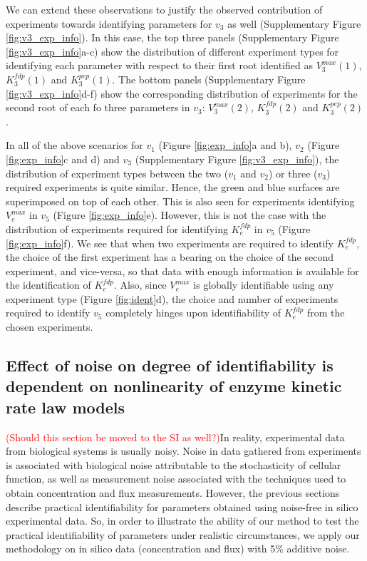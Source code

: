 \documentclass[10pt]{article}
\begin{document}
	We can extend these observations to justify the observed contribution of experiments towards identifying parameters for $v_3$ as well (Supplementary Figure \ref{fig:v3_exp_info}). In this case, the top three panels (Supplementary Figure \ref{fig:v3_exp_info}a-c) show the distribution of different experiment types for identifying each parameter with respect to their first root identified as $V_3^{max}(1)$, $K_3^{fdp}(1)$ and $K_3^{pep}(1)$. The bottom panels (Supplementary Figure \ref{fig:v3_exp_info}d-f) show the corresponding distribution of experiments for the second root of each fo three parameters in $v_3$: $V_3^{max}(2)$, $K_3^{fdp}(2)$ and $K_3^{pep}(2)$. 
	
	In all of the above scenarios for $v_1$ (Figure \ref{fig:exp_info}a and b), $v_2$ (Figure \ref{fig:exp_info}c and d) and $v_3$ (Supplementary Figure \ref{fig:v3_exp_info}), the distribution of experiment types between the two ($v_1$ and $v_2$) or three ($v_3$) required experiments is quite similar. Hence, the green and blue surfaces are superimposed on top of each other. This is also seen for experiments identifying $V_e^{max}$ in $v_5$ (Figure \ref{fig:exp_info}e). However, this is not the case with the distribution of experiments required for identifying $K_e^{fdp}$ in $v_5$ (Figure \ref{fig:exp_info}f). We see that when two experiments are required to identify $K_e^{fdp}$, the choice of the first experiment has a bearing on the choice of the second experiment, and vice-versa, so that data with enough information is available for the identification of $K_e^{fdp}$. Also, since $V_e^{max}$ is globally identifiable using any experiment type (Figure \ref{fig:ident}d), the choice and number of experiments required to identify $v_5$ completely hinges upon identifiability of $K_e^{fdp}$ from the chosen experiments.		 
		
	\subsection{Effect of noise on degree of identifiability is dependent on nonlinearity of enzyme kinetic rate law models}\label{sec:noise}
	\textcolor{red}{(Should this section be moved to the SI as well?)}In reality, experimental data from biological systems is usually noisy. Noise in data gathered from experiments is associated with biological noise attributable to the stochasticity of cellular function, as well as measurement noise associated with the techniques used to obtain concentration and flux measurements. However, the previous sections describe practical identifiability for parameters obtained using noise-free in silico experimental data. So, in order to illustrate the ability of our method to test the practical identifiability of parameters under realistic circumstances, we apply our methodology on in silico data (concentration and flux) with 5\% additive noise. 
	
\end{document}
